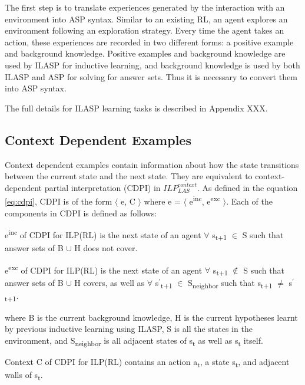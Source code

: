 The first step is to translate experiences generated by the interaction with an environment into ASP syntax. 
Similar to an existing RL, an agent explores an environment following an exploration strategy.
Every time the agent takes an action, these experiences are recorded in two different forms: 
a positive example and background knowledge. 
Positive examples and background knowledge are used by ILASP for inductive learning, and background knowledge is used by both ILASP and ASP for solving for answer sets.
Thus it is necessary to convert them into ASP syntax.

The full details for ILASP learning tasks is described in Appendix XXX.

\subsection{Context Dependent Examples}
Context dependent examples contain information about how the state transitions between the current state and the next state.
They are equivalent to context-dependent partial interpretation (CDPI) in  $ILP_{LAS}^{context}$. 
As defined in the equation \ref{eq:cdpi}, CDPI is of the form $\langle$ e, C $\rangle$ where e = $\langle$ e\textsuperscript{inc}, e\textsuperscript{exc} $\rangle$. 
Each of the components in CDPI is defined as follows:
\begin{defn}
e\textsuperscript{inc} of CDPI for ILP(RL) is the next state of an agent $\forall$ s\textsubscript{t+1} $\in$ S such that answer sets of B $\cup$ H does not cover.
\end{defn}

\begin{defn} \label{def:ILPRL_context}
e\textsuperscript{exc} of CDPI for ILP(RL) is the next state of an agent $\forall$ s\textsubscript{t+1} $\not\in$ S such that answer sets of B $\cup$ H covers,
as well as $\forall$ s$^\prime$\textsubscript{t+1} $\in$ S\textsubscript{neighbor} such that s\textsubscript{t+1} $\neq$ s$^\prime$\textsubscript{t+1}.
\end{defn}
where B is the current background knowledge, H is the current hypotheses learnt by previous inductive learning using ILASP, S is all the states in the environment, and S\textsubscript{neighbor} is all adjacent states of s\textsubscript{t} as well as s\textsubscript{t} itself.

\begin{defn}
Context C of CDPI for ILP(RL) contains an action a\textsubscript{t}, a state s\textsubscript{t}, and adjacent walls of s\textsubscript{t}.
\label{def:context}
\end{defn}

